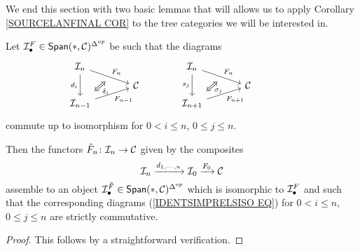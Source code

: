 \documentclass[a4paper,10pt]{article}%
\begin{document}
We end this section with two basic lemmas that will allows us to apply Corollary \ref{SOURCELANFINAL COR}
to the tree categories we will be interested in.

\begin{lemma}\label{TWISTING LEMMA}
  Let $\mcI_{\bullet}^F \in \mathsf{Span}(\**,\C)^{\Delta^{op}}$ be such that the diagrams
  \begin{equation}\label{IDENTSIMPRELSISO EQ}
    \begin{tikzcd}[row sep=0.4em,column sep = 3.5em]
      \mathcal{I}_n
      \ar{dr}[name=F1]{F_n} \ar{dd}[swap]{d_i} & &
      \mathcal{I}_n
      \ar{dr}[name=F2]{F_n} \ar{dd}[swap]{s_j} & &
      \\
      & \C & & \C &
      \\
      |[alias=G2]| \mathcal{I}_{n-1}  \ar{ur}[swap]{F_{n-1}} & & 
      |[alias=G3]| \mathcal{I}_{n+1}  \ar{ur}[swap]{F_{n+1}} & &
      \arrow[Leftrightarrow, from=F1, to=G2,shorten >=0.25cm,shorten <=0.25cm,"\delta_{i}"]
      \arrow[Leftrightarrow, from=F2, to=G3,shorten >=0.25cm,shorten <=0.25cm,"\sigma_{j}"]
    \end{tikzcd}
  \end{equation}
  commute up to isomorphism for $0 < i \leq n$, $0 \leq j \leq n$.

  Then the functors $\tilde{F}_n \colon \mathcal{I}_n \to \mathcal{C}$ given by the composites
  \[
  \mathcal{I}_n \xrightarrow{d_{1,\cdots,n}} 
  \mathcal{I}_0 \xrightarrow{F_0}
  \mathcal{C}
  \]
  assemble to an object 
  $\mcI_{\bullet}^{\tilde{F}} \in \mathsf{Span}(\**,\C)^{\Delta^{op}}$ which is isomorphic to $\mathcal{I}_{\bullet}^F$ and such that the corresponding diagrams (\ref{IDENTSIMPRELSISO EQ}) for $0 < i \leq n$, $0 \leq j \leq n$ are strictly commutative.
\end{lemma}


\begin{proof}
  This follows by a straightforward verification.
\end{proof}
\end{document}
